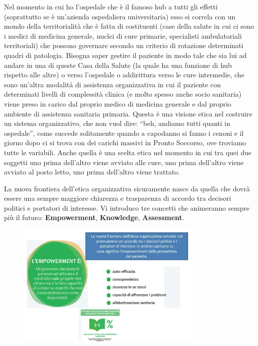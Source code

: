 Nel momento in cui ho l'ospedale che è il famoso hub a tutti gli effetti
(soprattutto se è un'azienda ospedaliera universitaria) esso si correla
con un mondo della territorialità che è fatta di costituenti (case della
salute in cui ci sono i medici di medicina generale, nuclei di cure
primarie, specialisti ambulatoriali territoriali) che possono governare
secondo un criterio di rotazione determinati quadri di patologia.
Bisogna saper gestire il paziente in modo tale che sia lui ad andare in
una di queste Casa della Salute (la quale ha una funzione di hub
rispetto alle altre) o verso l'ospedale o addirittura verso le cure
intermedie, che sono un'altra modalità di assistenza organizzativa in
cui il paziente con determinati livelli di complessità clinica (e molto
spesso anche socio sanitaria) viene preso in carico dal proprio medico
di medicina generale e dal proprio ambiente di assistenza sanitaria
primaria. Questa è una visione etica nel costruire un sistema
organizzativo, che non vuol dire: ``beh, andiamo tutti quanti in
ospedale'', come succede solitamente quando a capodanno si fanno i
cenoni e il giorno dopo ci si trova con dei carichi massivi in Pronto
Soccorso, ove troviamo tutte le variabili. Anche quella è una scelta
etica nel momento in cui tra quei due soggetti uno prima dell'altro
viene avviato alle cure, uno prima dell'altro viene avviato al posto
letto, uno prima dell'altro viene trattato.

La nuova frontiera dell'etica organizzativa sicuramente nasce da quella
che dovrà essere una sempre maggiore chiarezza e trasparenza di accordo
tra decisori politici e portatori di interesse. Vi introduco tre
concetti che animeranno sempre più il futuro: \textbf{Empowerment},
\textbf{Knowledge}, \textbf{Assessment}.

 \begin{figure}[!ht]
\centering
	\includegraphics[width=0.8\textwidth]{32/image12.jpeg}
	\end{figure}
	
